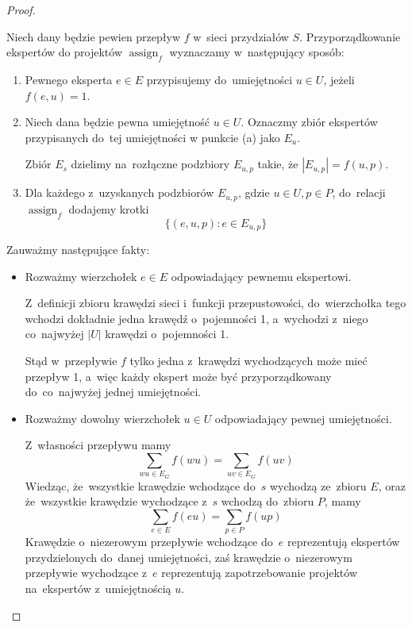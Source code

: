 \documentclass[12pt,a4paper]{article}
\theoremstyle{definition}
\DeclareMathOperator{\assign}{assign}
\begin{document}
\begin{proof}
\begin{enumerate}
	Niech dany będzie pewien przepływ $f$ w~sieci przydziałów $S$.
	Przyporządkowanie ekspertów do projektów $\assign_f$ wyznaczamy
	w~następujący sposób:
	\begin{enumerate}
		\item Pewnego eksperta $e \in E$ przypisujemy do~umiejętności $u \in U$,
		jeżeli $f(e,u) = 1$.
		\item Niech dana będzie pewna umiejętność $u \in U$. Oznaczmy zbiór
		ekspertów przypisanych do~tej umiejętności w punkcie (a) jako $E_u$.

		Zbiór $E_s$ dzielimy na~rozłączne podzbiory $E_{u,p}$ takie, że
		$|E_{u,p}| = f(u,p)$.
		\item Dla każdego z~uzyskanych podzbiorów $E_{u,p}$, gdzie
		$u \in U, p \in P$, do~relacji $\assign_f$ dodajemy krotki
		$$ \{ (e,u,p) : e \in E_{u,p} \} $$

	\end{enumerate}
	Zauważmy następujące fakty:
	\begin{itemize}
		\item Rozważmy wierzchołek $e \in E$ odpowiadający pewnemu ekspertowi.
		
		Z~definicji zbioru krawędzi sieci i~funkcji przepustowości,
		do~wierzchołka tego wchodzi dokładnie jedna krawędź o~pojemności 1,
		a~wychodzi z~niego co~najwyżej $|U|$ krawędzi o~pojemności 1.

		Stąd w~przepływie $f$ tylko jedna z~krawędzi wychodzących może mieć
		przepływ 1, a~więc każdy ekspert może być przyporządkowany
		do~co~najwyżej jednej umiejętności.
		\item Rozważmy dowolny wierzchołek $u \in U$ odpowiadający pewnej
		umiejętności.

		Z~własności przepływu mamy
		$$ \sum_{wu \in E_G} f(wu) = \sum_{uv \in E_G} f(uv) $$
		Wiedząc, że~wszystkie krawędzie wchodzące do~$s$ wychodzą ze~zbioru $E$,
		oraz że~wszystkie krawędzie wychodzące z~$s$ wchodzą do~zbioru $P$, mamy
		$$ \sum_{e \in E} f(eu) = \sum_{p \in P} f(up) $$
		Krawędzie o~niezerowym przepływie wchodzące do~$e$ reprezentują
		ekspertów przydzielonych do~danej umiejętności, zaś krawędzie
		o~niezerowym przepływie wychodzące z~$e$ reprezentują zapotrzebowanie
		projektów na~ekspertów z~umiejętnością $u$.


\end{itemize}
\end{enumerate}
\end{proof}
\end{document}
